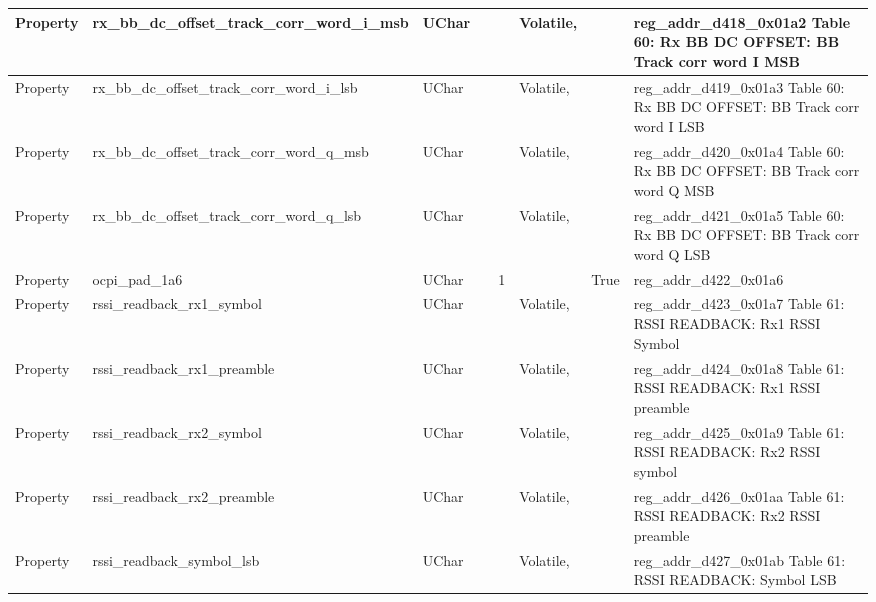 \documentclass{article}
\begin{document}
\begin{scriptsize}
\begin{longtable}{|p{2cm}|p{5cm}|p{1cm}|p{2cm}|p{2cm}|p{1.75cm}|p{1.5cm}|p{5.1cm}|}
  \hline
  Property & rx\_bb\_dc\_offset\_track\_corr\_word\_i\_msb            & UChar &                  &                  & Volatile,           &         & reg\_addr\_d418\_0x01a2 Table 60: Rx BB DC OFFSET: BB Track corr word I MSB \\
  \hline
  Property & rx\_bb\_dc\_offset\_track\_corr\_word\_i\_lsb            & UChar &                  &                  & Volatile,           &         & reg\_addr\_d419\_0x01a3 Table 60: Rx BB DC OFFSET: BB Track corr word I LSB \\
  \hline
  Property & rx\_bb\_dc\_offset\_track\_corr\_word\_q\_msb            & UChar &                  &                  & Volatile,           &         & reg\_addr\_d420\_0x01a4 Table 60: Rx BB DC OFFSET: BB Track corr word Q MSB \\
  \hline
  Property & rx\_bb\_dc\_offset\_track\_corr\_word\_q\_lsb            & UChar &                  &                  & Volatile,           &         & reg\_addr\_d421\_0x01a5 Table 60: Rx BB DC OFFSET: BB Track corr word Q LSB \\
  \hline
  Property & ocpi\_pad\_1a6                                           & UChar &                  & 1                &                     & True    & reg\_addr\_d422\_0x01a6 \\
  \hline
  Property & rssi\_readback\_rx1\_symbol                              & UChar &                  &                  & Volatile,           &         & reg\_addr\_d423\_0x01a7 Table 61: RSSI READBACK: Rx1 RSSI Symbol \\
  \hline
  Property & rssi\_readback\_rx1\_preamble                            & UChar &                  &                  & Volatile,           &         & reg\_addr\_d424\_0x01a8 Table 61: RSSI READBACK: Rx1 RSSI preamble \\
  \hline
  Property & rssi\_readback\_rx2\_symbol                              & UChar &                  &                  & Volatile,           &         & reg\_addr\_d425\_0x01a9 Table 61: RSSI READBACK: Rx2 RSSI symbol \\
  \hline
  Property & rssi\_readback\_rx2\_preamble                            & UChar &                  &                  & Volatile,           &         & reg\_addr\_d426\_0x01aa Table 61: RSSI READBACK: Rx2 RSSI preamble \\
  \hline
  Property & rssi\_readback\_symbol\_lsb                              & UChar &                  &                  & Volatile,           &         & reg\_addr\_d427\_0x01ab Table 61: RSSI READBACK: Symbol LSB \\

\end{longtable}
\end{scriptsize}
\end{document}
